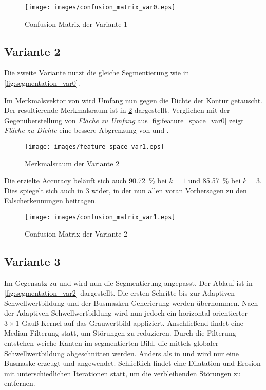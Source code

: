 \begin{figure}[htb]
    \centering
    \texttt{[image: images/confusion\_matrix\_var0.eps]}
    \caption{\foreignlanguage{english}{Confusion Matrix} der Variante 1\label{fig:confusion_matrix_var0}}
\end{figure}

\FloatBarrier{}

\subsection{Variante 2\label{sct:variant1}}

Die zweite Variante nutzt die gleiche Segmentierung wie in \cref{fig:segmentation_var0}.

Im Merkmalsvektor von  wird Umfang nun gegen die Dichte der Kontur getauscht. Der resultierende Merkmalsraum ist in \cref{fig:feature_space_var1} dargestellt. Verglichen mit der Gegenüberstellung von \emph{Fläche zu Umfang} aus \cref{fig:feature_space_var0} zeigt \emph{Fläche zu Dichte} eine bessere Abgrenzung von  und .

\begin{figure}[htb]
    \centering
    \texttt{[image: images/feature\_space\_var1.eps]}
    \caption{Merkmalsraum der Variante 2\label{fig:feature_space_var1}}
\end{figure}

Die erzielte \foreignlanguage{english}{Accuracy} beläuft sich auch \SI{90.72}{\percent} bei \(k = 1\) und \SI{85.57}{\percent} bei \(k = 3\). Dies spiegelt sich auch in \cref{fig:confusion_matrix_var1} wider, in der nun allen voran  Vorhersagen zu den Falscherkennungen beitragen.

\begin{figure}[htb]
    \centering
    \texttt{[image: images/confusion\_matrix\_var1.eps]}
    \caption{\foreignlanguage{english}{Confusion Matrix} der Variante 2\label{fig:confusion_matrix_var1}}
\end{figure}

\FloatBarrier{}

\subsection{Variante 3\label{sct:variant2}}

Im Gegensatz zu  und  wird nun die Segmentierung angepasst. Der Ablauf ist in \cref{fig:segmentation_var2} dargestellt. Die ersten Schritte bis zur Adaptiven Schwellwertbildung und der Busmasken Generierung werden übernommen. Nach der Adaptiven Schwellwertbildung wird nun jedoch ein horizontal orientierter \(3 \times 1\) Gauß-Kernel auf das Grauwertbild appliziert. Anschließend findet eine Median Filterung statt, um Störungen zu reduzieren. Durch die Filterung entstehen weiche Kanten im segmentierten Bild, die mittels globaler Schwellwertbildung abgeschnitten werden. Anders als in  und  wird nur eine Busmaske erzeugt und angewendet. Schließlich findet eine Dilatation und Erosion mit unterschiedlichen Iterationen statt, um die verbleibenden Störungen zu entfernen.

